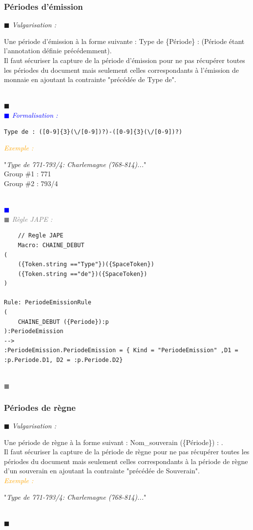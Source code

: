 \documentclass[a4paper, 11pt]{report}
\newenvironment{vulgarisation}
    {
    \textit{\textcolor{dark-blue}{$\blacksquare$  Vulgarisation : \\}}

    }
    {
    ~\\\textcolor{dark-blue}{$\blacksquare$}\\
    }
\newenvironment{formalisation}
    {
    \textit{\textcolor{blue}{$\blacksquare$  Formalisation : \\}}
    }
    {
    ~\\\textcolor{blue}{$\blacksquare$}\\
    }
\newenvironment{codage}
    {
    \textit{\textcolor{gray}{$\blacksquare$  Règle JAPE : \\}}
    }
    {
    ~\\\textcolor{gray}{$\blacksquare$}\\
    }
\newenvironment{exemple}
    {
    \textit{\textcolor{orange}{
    Exemple : \\}}
    }
    {\\
    }
\begin{document}
\newpage
\subsubsection{Périodes d'émission}
\begin{vulgarisation}
	Une période d'émission à la forme suivante :  \og Type de \{Période\} : \fg{} (Période étant l'annotation définie précédemment).\\
	Il faut sécuriser la capture de la période d'émission pour ne pas récupérer toutes les périodes du document mais seulement celles correspondants à l’émission de monnaie en ajoutant la contrainte "précédée de Type de".
\end{vulgarisation}
\begin{formalisation}
	\begin{verbatim}
Type de : ([0-9]{3}(\/[0-9])?)-([0-9]{3}(\/[0-9])?)
	\end{verbatim}
	\begin{exemple}
		"\emph{Type de 771-793/4: Charlemagne (768-814)...}" \\
		Group \#1 : 771 \\
		Group \#2 : 793/4
	\end{exemple}

\end{formalisation}
			\begin{codage}
	\begin{lstlisting}
	// Regle JAPE
	Macro: CHAINE_DEBUT
(
    ({Token.string =="Type"})({SpaceToken})
    ({Token.string =="de"})({SpaceToken})
)

Rule: PeriodeEmissionRule
(
    CHAINE_DEBUT ({Periode}):p
):PeriodeEmission
-->
:PeriodeEmission.PeriodeEmission = { Kind = "PeriodeEmission" ,D1 = :p.Periode.D1, D2 = :p.Periode.D2}
	\end{lstlisting}
	\end{codage}

\subsubsection{Périodes de règne}
\begin{vulgarisation}
	Une période de règne à la forme suivant : \og Nom\_souverain (\{Période\}) : \fg{}.\\
	Il faut sécuriser la capture de la période de règne pour ne pas récupérer toutes les périodes du document mais seulement celles correspondants à la période de règne d'un souverain en ajoutant la contrainte "précédée de Souverain".\\
	\begin{exemple}
		"\emph{Type de 771-793/4: Charlemagne (768-814)...}" 
	\end{exemple}
\end{vulgarisation}
\end{document}

